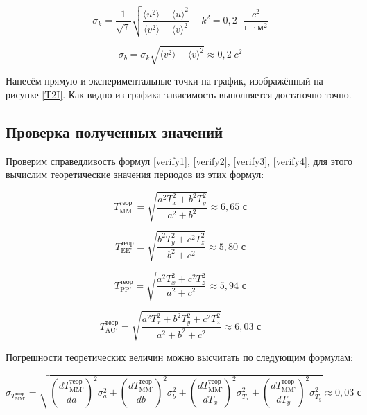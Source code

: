 \documentclass[a4paper, 12pt]{article}
\begin{document}
\begin{equation}
    \sigma_k = \frac{1}{\sqrt{7}} \sqrt{\frac{\langle u^2 \rangle - \langle u \rangle^2}{\langle v^2 \rangle - \langle v \rangle^2} - k^2} = 0,2 \text{ } \frac{c^2}{\text{г } \cdot \text{м}^2}
\end{equation}

\begin{equation}
    \sigma_b = \sigma_k\sqrt{\langle v^2 \rangle - \langle v \rangle^2} \approx 0,2\; c^2
\end{equation}

Нанесём прямую и экспериментальные точки на график, изображённый на рисунке \ref{T2I}. Как видно из графика зависимость выполняется достаточно точно.

\subsection{Проверка полученных значений}

Проверим справедливость формул \eqref{verify1}, \eqref{verify2}, \eqref{verify3}, \eqref{verify4}, для этого вычислим теоретические значения периодов из этих формул:

\begin{equation}
    T_{\text{MM'}}^\text{теор} = \sqrt{\frac{a^2 T^2_{x}+b^2 T^2_{y}}{a^2+b^2}} \approx 6,65 \text{ с}
\end{equation}

\begin{equation}
    T_{\text{EE'}}^\text{теор} = \sqrt{\frac{b^2 T^2_{y}+c^2 T^2_{z}}{b^2+c^2}} \approx 5,80 \text{ с}
\end{equation}

\begin{equation}
    T_{\text{PP'}}^\text{теор} = \sqrt{\frac{a^2 T^2_{x}+c^2 T^2_{z}}{a^2+c^2}} \approx 5,94 \text{ с}
\end{equation}

\begin{equation}
    T_{\text{AC'}}^\text{теор} = \sqrt{\frac{a^2 T^2_{x}+b^2 T^2_{y}+c^2 T^2_{z}}{a^2+b^2+c^2}} \approx 6,03 \text{ с}
\end{equation}

Погрешности теоретических величин можно высчитать по следующим формулам:

\begin{equation}
    \sigma_{T_{\text{MM'}}^\text{теор}} = \sqrt{
    \left( \frac{dT_{\text{MM'}}^\text{теор}}{da} \right) ^ 2 \sigma_{a}^2 + 
    \left( \frac{dT_{\text{MM'}}^\text{теор}}{db} \right) ^ 2 \sigma_{b}^2 + 
    \left( \frac{dT_{\text{MM'}}^\text{теор}}{dT_{x}} \right) ^ 2 \sigma_{T_{x}}^2 + 
    \left( \frac{dT_{\text{MM'}}^\text{теор}}{dT_{y}} \right) ^ 2 \sigma_{T_{y}}^2
    } \approx 0,03 \text{ с}
\end{equation}
\end{document}
